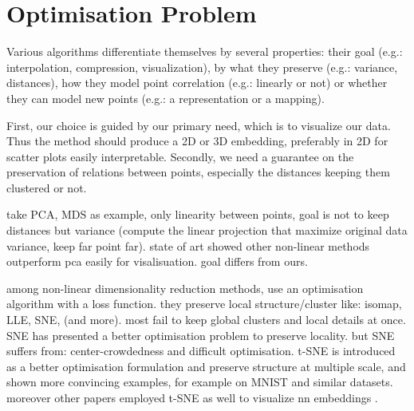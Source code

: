 \documentclass[a4paper,12pt]{report}
\newcommand{\eg}{e.g.}
\begin{document}
\section{Optimisation Problem}
Various algorithms differentiate themselves by several properties: their goal (\eg: interpolation, compression, visualization), by what they preserve (\eg: variance, distances), how they model point correlation (\eg: linearly or not) or whether they can model new points (\eg: a representation or a mapping).

First, our choice is guided by our primary need, which is to visualize our data.
Thus the method should produce a 2D or 3D embedding, preferably in 2D for scatter plots easily interpretable.
Secondly, we need a guarantee on the preservation of relations between points, especially the distances keeping them clustered or not.

take PCA, MDS as example, only linearity between points, goal is not to keep distances but variance (compute the linear projection that maximize original data variance, keep far point far).
state of art showed other non-linear methods outperform pca easily for visalisuation.
goal differs from ours.

among non-linear dimensionality reduction methods, use an optimisation algorithm with a loss function.
they preserve local structure/cluster like: isomap, LLE, SNE, (and more).
most fail to keep global clusters and local details at once.
SNE has presented a better optimisation problem to preserve locality\cite{SNE}.
but SNE suffers from: center-crowdedness and difficult optimisation.
t-SNE is introduced as a better optimisation formulation and preserve structure at multiple scale, and shown more convincing examples, for example on MNIST\cite{t-SNE} and similar datasets\cite{van2009new}.
moreover other papers employed t-SNE as well to visualize nn embeddings \cite{donahue2013decaf}\cite{yu2014visualizing}\cite{yaotiny}.
\end{document}
